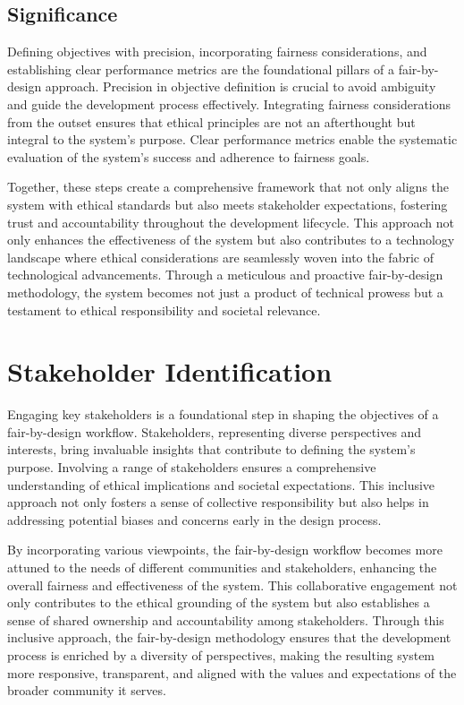 \documentclass[12pt,a4paper,openright,twoside]{book}
\begin{document}
\subsection{Significance}

Defining objectives with precision, incorporating fairness considerations, and establishing clear performance metrics are the foundational pillars of a fair-by-design approach. Precision in objective definition is crucial to avoid ambiguity and guide the development process effectively. Integrating fairness considerations from the outset ensures that ethical principles are not an afterthought but integral to the system's purpose. Clear performance metrics enable the systematic evaluation of the system's success and adherence to fairness goals.

Together, these steps create a comprehensive framework that not only aligns the system with ethical standards but also meets stakeholder expectations, fostering trust and accountability throughout the development lifecycle. This approach not only enhances the effectiveness of the system but also contributes to a technology landscape where ethical considerations are seamlessly woven into the fabric of technological advancements. Through a meticulous and proactive fair-by-design methodology, the system becomes not just a product of technical prowess but a testament to ethical responsibility and societal relevance.

\section{Stakeholder Identification}
\label{section:stakeholder-identification}

Engaging key stakeholders is a foundational step in shaping the objectives of a fair-by-design workflow. Stakeholders, representing diverse perspectives and interests, bring invaluable insights that contribute to defining the system's purpose. Involving a range of stakeholders ensures a comprehensive understanding of ethical implications and societal expectations. This inclusive approach not only fosters a sense of collective responsibility but also helps in addressing potential biases and concerns early in the design process.

By incorporating various viewpoints, the fair-by-design workflow becomes more attuned to the needs of different communities and stakeholders, enhancing the overall fairness and effectiveness of the system. This collaborative engagement not only contributes to the ethical grounding of the system but also establishes a sense of shared ownership and accountability among stakeholders. Through this inclusive approach, the fair-by-design methodology ensures that the development process is enriched by a diversity of perspectives, making the resulting system more responsive, transparent, and aligned with the values and expectations of the broader community it serves.
\end{document}
